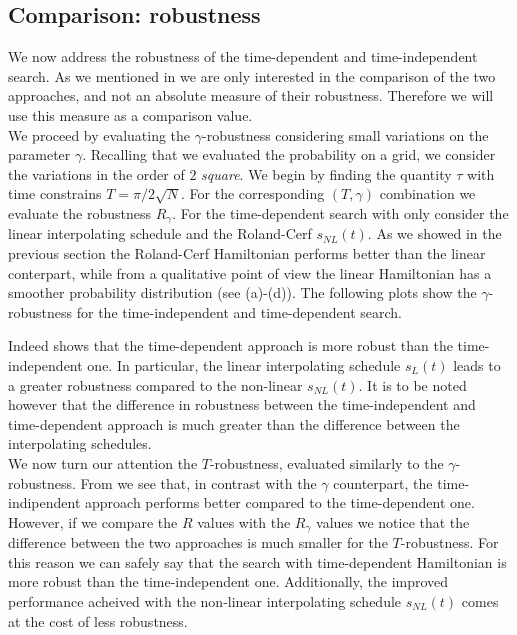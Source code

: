         \clearpage
    \subsection{Comparison: robustness}\label{subsec:comparison_robustness}
    We now address the robustness of the time-dependent and time-independent search. As we mentioned in  we are only interested in the comparison of the two approaches, and not an absolute measure of their robustness. Therefore we will use this measure as a comparison value. \\
    We proceed by evaluating the $\gamma$-robustness considering small variations on the parameter $\gamma$. Recalling that we evaluated the probability on a grid, we consider the variations in the order of $2$ \textit{square}. We begin by finding the quantity $\tau$ with time constrains $T = \pi/2\sqrt{N}$. For the corresponding $(T,\gamma)$ combination we evaluate the robustness $R_\gamma$.
    For the time-dependent search with only consider the linear interpolating schedule and the Roland-Cerf $s_{NL}(t)$. As we showed in the previous section the Roland-Cerf Hamiltonian performs better than the linear conterpart, while from a qualitative point of view the linear Hamiltonian has a smoother probability distribution (see (a)-(d)). The following plots show the $\gamma$-robustness for the time-independent and time-dependent search.
    
    Indeed  shows that the time-dependent approach is more robust than the time-independent one. In particular, the linear interpolating schedule $s_L(t)$ leads to a greater robustness compared to the non-linear $s_{NL}(t)$. It is to be noted however that the difference in robustness between the time-independent and time-dependent approach is much greater than the difference between the interpolating schedules. \\

    \noindent
    We now turn our attention the $T$-robustness, evaluated similarly to the $\gamma$-robustness. From  we see that, in contrast with the $\gamma$ counterpart, the time-indipendent approach performs better compared to the time-dependent one. However, if we compare the $R$ values with the $R_\gamma$ values we notice that the difference between the two approaches is much smaller for the $T$-robustness. For this reason we can safely say that the search with time-dependent Hamiltonian is more robust than the time-independent one. Additionally, the improved performance acheived with the non-linear interpolating schedule $s_{NL}(t)$ comes at the cost of less robustness.

    
